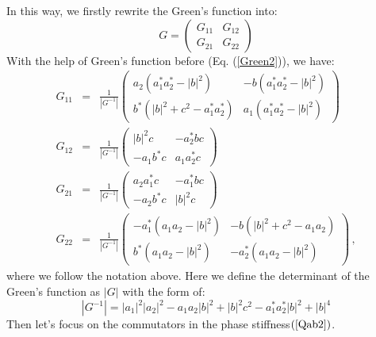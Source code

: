 \documentclass[aps,onecolumn,superscriptaddress,notitlepage,longbibliography]{revtex4-1}
\begin{document}
In this way, we firstly rewrite the Green's function into:
\begin{equation}
  G = \left(\begin{array}{cc}
    G_{11} & G_{12}\\
    G_{21} & G_{22}
  \end{array}\right)
\end{equation}
With the help of Green's function before (Eq. (\ref{Green2})), we have:
\begin{eqnarray}
  G_{11} & = & \frac{1}{| G^{- 1} |} \left(\begin{array}{cc}
    a_2 (a_1^{\ast} a_2^{\ast} - | b |^2) & - b (a_1^{\ast} a_2^{\ast} - | b
    |^2)\\
    b^{\ast} (| b |^2 + c^2 - a_1^{\ast} a_2^{\ast}) & a_1 (a_1^{\ast}
    a_2^{\ast} - | b |^2)
  \end{array}\right) \\
  G_{12} & = & \frac{1}{| G^{- 1} |} \left(\begin{array}{cc}
    | b |^2 c & - a_2^{\ast} b c\\
    - a_1 b^{\ast} c & a_1 a_2^{\ast} c
  \end{array}\right) \\
  G_{21} & = & \frac{1}{| G^{- 1} |} \left(\begin{array}{cc}
    a_2 a_1^{\ast} c & - a_1^{\ast} b c\\
    - a_2 b^{\ast} c & | b |^2 c
  \end{array}\right) \\
  G_{22} & = & \frac{1}{| G^{- 1} |} \left(\begin{array}{cc}
    - a_1^{\ast} (a_1 a_2 - | b |^2) & - b (| b |^2 + c^2 - a_1 a_2)\\
    b^{\ast} (a_1 a_2 - | b |^2) & - a_2^{\ast} (a_1 a_2 - | b |^2)
  \end{array}\right) \,, 
\end{eqnarray}
where we follow the notation above. Here we define the determinant of the
Green's function as $| G |$ with the form of:
\begin{equation}
  | G^{- 1} | = | a_1 |^2 | a_2 |^2 - a_1 a_2 | b |^2 + | b |^2 c^2 -
  a_1^{\ast} a_2^{\ast} | b |^2 + | b |^4 \label{deter}
\end{equation}
Then let's focus on the commutators in the phase stiffness$\left( \ref{Qab2}
\right)$.
\end{document}
